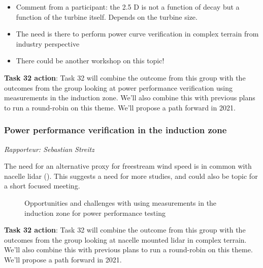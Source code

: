 \begin{itemize}
    \item Comment from a participant: the 2.5 D is not a function of decay but a function of the turbine itself. Depends on the turbine size.
    \item The need is there to perform power curve verification in complex terrain from industry perspective
    \item There could be another workshop on this topic!
    \end{itemize}

\textbf{Task 32 action}: Task 32 will combine the outcome from this group with the outcomes from the group looking at power performance verification using measurements in the induction zone. We'll also combine this with previous plans to run a round-robin on this theme. We'll propose a path forward in 2021.

\subsubsection{Power performance verification in the induction zone}

\emph{Rapporteur: Sebastian Streitz}

The need for an alternative proxy for freestream wind speed is in common with nacelle lidar (). This suggests a need for more studies, and could also be topic for a short focused meeting.

\begin{figure}[p]
    \centering
    \caption{Opportunities and challenges with using measurements in the induction zone for power performance testing}
    \label{fig:day3-powerperformance}
\end{figure}

\textbf{Task 32 action}: Task 32 will combine the outcome from this group with the outcomes from the group looking at nacelle mounted lidar in complex terrain. We'll also combine this with previous plans to run a round-robin on this theme. We'll propose a path forward in 2021.

